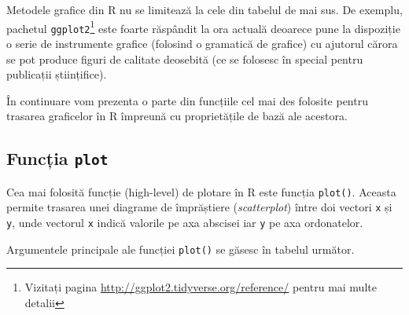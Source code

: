 \documentclass[]{article}
\let\rmarkdownfootnote\footnote%
\def\footnote{\protect\rmarkdownfootnote}
\newcounter{exo}[section]
\begin{document}
Metodele grafice din R nu se limitează la cele din tabelul de mai sus.
De exemplu, pachetul \texttt{ggplot2}\footnote{Vizitați pagina
  \url{http://ggplot2.tidyverse.org/reference/} pentru mai multe detalii}
este foarte răspândit la ora actuală deoarece pune la dispoziție o serie
de instrumente grafice (folosind o gramatică de grafice) cu ajutorul
cărora se pot produce figuri de calitate deosebită (ce se folosesc în
special pentru publicații științifice).

În continuare vom prezenta o parte din funcțiile cel mai des folosite
pentru trasarea graficelor în R împreună cu proprietățile de bază ale
acestora.

\hypertarget{funcux21bia-plot}{%
\subsection{\texorpdfstring{Funcția
\texttt{plot}}{Funcția plot}}\label{funcux21bia-plot}}

Cea mai folosită funcție (high-level) de plotare în R este funcția
\texttt{plot()}. Aceasta permite trasarea unei diagrame de împrăștiere
(\emph{scatterplot}) între doi vectori \texttt{x} și \texttt{y}, unde
vectorul \texttt{x} indică valorile pe axa abscisei iar \texttt{y} pe
axa ordonatelor.

Argumentele principale ale funcției \texttt{plot()} se găsesc în tabelul
următor.
\end{document}
